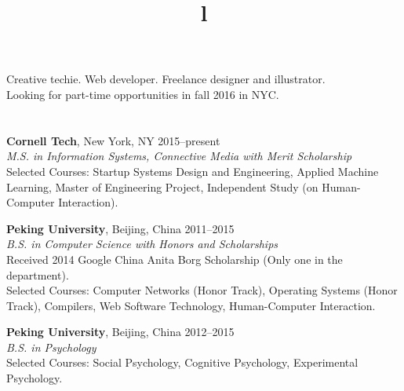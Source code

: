 \begin{resume}

\vspace{25pt}

\section{}

Creative techie. Web developer. Freelance designer and illustrator. \\
Looking for part-time opportunities in fall 2016 in NYC.


\section{}

\textbf{Cornell Tech}, New York, NY \hfill 2015--present \\
\textsl{M.S. in Information Systems, Connective Media with Merit Scholarship} \\
Selected Courses: Startup Systems Design and Engineering, Applied Machine Learning, Master of Engineering Project, Independent Study (on Human-Computer Interaction).

\textbf{Peking University}, Beijing, China \hfill 2011--2015 \\ 
\textsl{B.S. in Computer Science with Honors and Scholarships}\\
Received 2014 Google China Anita Borg Scholarship (Only one in the department). \\
Selected Courses: Computer Networks (Honor Track), Operating Systems (Honor Track), Compilers, Web Software Technology, Human-Computer Interaction.

\textbf{Peking University}, Beijing, China \hfill 2012--2015 \\ 
\textsl{B.S. in Psychology}\\
Selected Courses: Social Psychology, Cognitive Psychology, Experimental Psychology.

\begin{formatb}
  \\
  \title{l}\\
  \body\\
\end{formatb}


\section{}


\end{resume}
